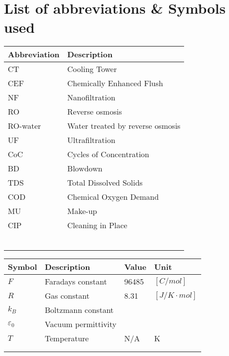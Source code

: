 \chapter*{List of abbreviations \& Symbols used}
\thispagestyle{empty}
\begin{table}[H] 
\centering
	\begin{tabular}{l l}
		Abbreviation   & Description            \\ \hline
	CT	     &     Cooling Tower \\ 
	CEF      & Chemically Enhanced Flush \\
	NF	     &   Nanofiltration   \\
	RO	     &   Reverse osmosis   \\
	RO-water &   Water treated by reverse osmosis \\
	UF	     &   Ultrafiltration   \\
	CoC      &   Cycles of Concentration   \\
	BD         &  Blowdown    \\
	TDS         &    Total Dissolved Solids  \\
	COD         &  Chemical Oxygen Demand    \\
	MU         &  Make-up    \\
	CIP         & Cleaning in Place     \\
	         &      \\
	         &      \\
	         &      \\
	         &      \\
	         &      \\
	         &      \\
	    
	    
	    
	    
		    
		    
		    
		    
	\end{tabular} 
	\label{tab:forkort} 
\end{table}

\begin{table}[H] 
\centering
	\begin{tabular}{l l l l }
		Symbol   & Description  & Value & Unit     \\ \hline

	   $F$      &    Faradays constant & 96485 & $[C/mol]$  \\
	   $R$ & Gas constant & 8.31 & $[J/K\cdot mol]$     \\
	         $k_B$&Boltzmann constant     &    &       \\
	        $\varepsilon_0$ &Vacuum permittivity     &    &       \\
	         $T$&Temperature     & N/A   & K      \\
	         &     &    &       \\
	         &     &    &       \\

	\end{tabular} 
	\label{tab:konstanter} 
\end{table}